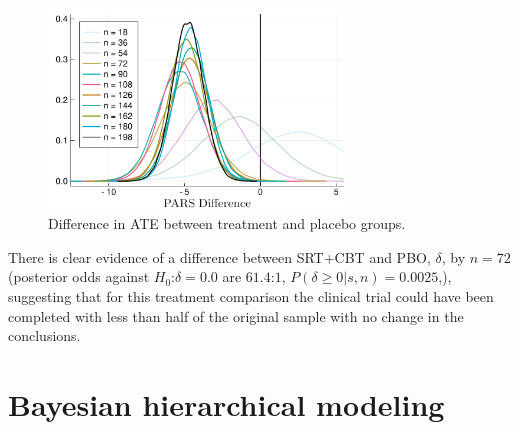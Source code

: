\documentclass{juliacon}
\begin{document}
\begin{table}
	\label{tab:seq}
\end{table}

\begin{figure}[t]
	\centerline{\includegraphics[width=8cm]{sequential_plot.pdf}}
	\caption{Difference in ATE between treatment and placebo groups.} 
	\label{fig:pars_diff}
\end{figure}

There is clear evidence of a difference between SRT+CBT and PBO, $\delta$, by $n=72$ (posterior odds against $H_0$:$\delta=0.0$ are $61.4$:$1$, $P(\delta \ge 0|s,n) = 0.0025$,), suggesting that for this treatment comparison the clinical trial could have been completed with less than half of the original sample with no change in the conclusions.

\section{Bayesian hierarchical modeling}
\label{sec:hbm}
\end{document}
